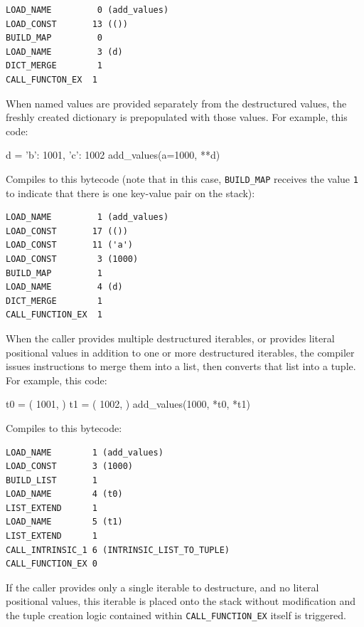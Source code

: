 \begin{verbatim}
LOAD_NAME         0 (add_values)
LOAD_CONST       13 (())
BUILD_MAP         0
LOAD_NAME         3 (d)
DICT_MERGE        1
CALL_FUNCTON_EX  1
\end{verbatim}

When named values are provided separately from the destructured values, the freshly
created dictionary is prepopulated with those values.
For example, this code:

\begin{pygmented}[lang=python]
d = { 'b': 1001, 'c': 1002 }
add_values(a=1000, **d)
\end{pygmented}

Compiles to this bytecode (note that in this case, \texttt{BUILD\_MAP} receives the value
\texttt{1} to indicate that there is one key-value pair on the stack):

\begin{verbatim}
LOAD_NAME         1 (add_values)
LOAD_CONST       17 (())
LOAD_CONST       11 ('a')
LOAD_CONST        3 (1000)
BUILD_MAP         1
LOAD_NAME         4 (d)
DICT_MERGE        1
CALL_FUNCTION_EX  1
\end{verbatim}

When the caller provides multiple destructured iterables, or provides literal positional
values in addition to one or more destructured iterables, the compiler issues instructions
to merge them into a list, then converts that list into a tuple.
For example, this code:

\begin{pygmented}[lang=python]
t0 = ( 1001, )
t1 = ( 1002, )
add_values(1000, *t0, *t1)
\end{pygmented}

Compiles to this bytecode:

\begin{verbatim}
LOAD_NAME        1 (add_values)
LOAD_CONST       3 (1000)
BUILD_LIST       1
LOAD_NAME        4 (t0)
LIST_EXTEND      1
LOAD_NAME        5 (t1)
LIST_EXTEND      1
CALL_INTRINSIC_1 6 (INTRINSIC_LIST_TO_TUPLE)
CALL_FUNCTION_EX 0
\end{verbatim}

If the caller provides only a single iterable to destructure, and no literal positional
values, this iterable is placed onto the stack without modification and the tuple creation
logic contained within \texttt{CALL\_FUNCTION\_EX} itself is triggered.

